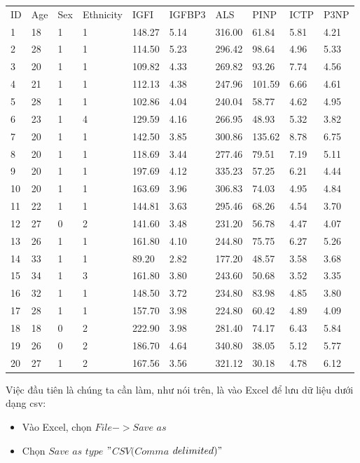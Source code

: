 \documentclass[
]{book}
\providecommand{\tightlist}{%
  \setlength{\itemsep}{0pt}\setlength{\parskip}{0pt}}
\begin{document}
\begin{longtable}[]{@{}llllllllll@{}}
\toprule
\endhead
ID & Age & Sex & Ethnicity & IGFI & IGFBP3 & ALS & PINP & ICTP & P3NP\tabularnewline
1 & 18 & 1 & 1 & 148.27 & 5.14 & 316.00 & 61.84 & 5.81 & 4.21\tabularnewline
2 & 28 & 1 & 1 & 114.50 & 5.23 & 296.42 & 98.64 & 4.96 & 5.33\tabularnewline
3 & 20 & 1 & 1 & 109.82 & 4.33 & 269.82 & 93.26 & 7.74 & 4.56\tabularnewline
4 & 21 & 1 & 1 & 112.13 & 4.38 & 247.96 & 101.59 & 6.66 & 4.61\tabularnewline
5 & 28 & 1 & 1 & 102.86 & 4.04 & 240.04 & 58.77 & 4.62 & 4.95\tabularnewline
6 & 23 & 1 & 4 & 129.59 & 4.16 & 266.95 & 48.93 & 5.32 & 3.82\tabularnewline
7 & 20 & 1 & 1 & 142.50 & 3.85 & 300.86 & 135.62 & 8.78 & 6.75\tabularnewline
8 & 20 & 1 & 1 & 118.69 & 3.44 & 277.46 & 79.51 & 7.19 & 5.11\tabularnewline
9 & 20 & 1 & 1 & 197.69 & 4.12 & 335.23 & 57.25 & 6.21 & 4.44\tabularnewline
10 & 20 & 1 & 1 & 163.69 & 3.96 & 306.83 & 74.03 & 4.95 & 4.84\tabularnewline
11 & 22 & 1 & 1 & 144.81 & 3.63 & 295.46 & 68.26 & 4.54 & 3.70\tabularnewline
12 & 27 & 0 & 2 & 141.60 & 3.48 & 231.20 & 56.78 & 4.47 & 4.07\tabularnewline
13 & 26 & 1 & 1 & 161.80 & 4.10 & 244.80 & 75.75 & 6.27 & 5.26\tabularnewline
14 & 33 & 1 & 1 & 89.20 & 2.82 & 177.20 & 48.57 & 3.58 & 3.68\tabularnewline
15 & 34 & 1 & 3 & 161.80 & 3.80 & 243.60 & 50.68 & 3.52 & 3.35\tabularnewline
16 & 32 & 1 & 1 & 148.50 & 3.72 & 234.80 & 83.98 & 4.85 & 3.80\tabularnewline
17 & 28 & 1 & 1 & 157.70 & 3.98 & 224.80 & 60.42 & 4.89 & 4.09\tabularnewline
18 & 18 & 0 & 2 & 222.90 & 3.98 & 281.40 & 74.17 & 6.43 & 5.84\tabularnewline
19 & 26 & 0 & 2 & 186.70 & 4.64 & 340.80 & 38.05 & 5.12 & 5.77\tabularnewline
20 & 27 & 1 & 2 & 167.56 & 3.56 & 321.12 & 30.18 & 4.78 & 6.12\tabularnewline
\bottomrule
\end{longtable}

Việc đầu tiên là chúng ta cần làm, như nói trên, là vào Excel để lưu dữ liệu dưới dạng csv:

\begin{itemize}
\tightlist
\item
  Vào Excel, chọn \(File -> Save\) \(as\)
\item
  Chọn \(Save\) \(as\) \(type\) \("\)\(CSV (Comma\) \(delimited)"\)
\end{itemize}
\end{document}
